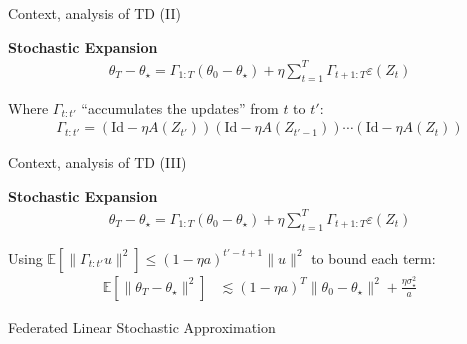 \documentclass[aspectratio=169,14pt]{beamer}
\begin{document}
\begin{frame}[t]{Context, analysis of TD (II) }

  \textbf{Stochastic Expansion}
  \begin{align*}
    \theta_T - \theta_\star
    =
    \Gamma_{1:T} (\theta_0 - \theta_\star) + \eta \sum_{t=1}^T \Gamma_{t+1:T} \varepsilon(Z_t)
  \end{align*}

  Where $\Gamma_{t:t'}$ ``accumulates the updates'' from $t$ to $t'$:
  \begin{align*}
    \Gamma_{t:t'} = (\text{Id} - \eta A(Z_{t'})) (\text{Id} - \eta A(Z_{t'-1})) \cdots (\text{Id} - \eta A(Z_t))
  \end{align*}

  \vspace{1em}


\end{frame}



\begin{frame}[t]{Context, analysis of TD (III) }

  \textbf{Stochastic Expansion}
  \begin{align*}
    \theta_T - \theta_\star
    =
    \Gamma_{1:T} (\theta_0 - \theta_\star) + \eta \sum_{t=1}^T \Gamma_{t+1:T} \varepsilon(Z_t)
  \end{align*}

  \vspace{-0.5em}

  Using $\mathbb{E}[ \| \Gamma_{t:t'} u  \|^2 ] \le (1 - \eta a)^{t' - t + 1} \| u \|^2$ to bound each term:
  \begin{align*}
    \mathbb{E} [ \| \theta_T - \theta_\star \|^2 ]
    & \lesssim{}
      (1 - \eta a)^T \| \theta_0 - \theta_\star \|^2
      + \frac{\eta \sigma_\star^2}{a}
  \end{align*}

  \vspace{0.5em}
  
\end{frame}

\begin{frame}
  \begin{center}
    \textcolor{beamer@blendedblue}{
      \huge Federated Linear Stochastic Approximation
    }
  \end{center}

\end{frame}
\end{document}
